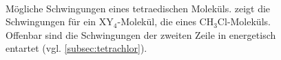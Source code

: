 \documentclass[../bericht.tex]{subfiles}
\begin{document}
        \begin{figure}[p]
          \centering
            \\
          \caption[Mögliche Schwingungen eines tetraedischen Moleküls.]{Mögliche Schwingungen eines tetraedischen Moleküls. \protect{} zeigt die Schwingungen für ein $\mathrm{XY_4}$-Molekül, \protect{} die eines $\mathrm{CH_3Cl}$-Moleküls. Offenbar sind die Schwingungen der zweiten Zeile in \protect{} energetisch entartet (vgl. \cref{subsec:tetrachlor}). \cite{herzberg}}
          \label{fig:schwingungen}
        \end{figure}
\end{document}
